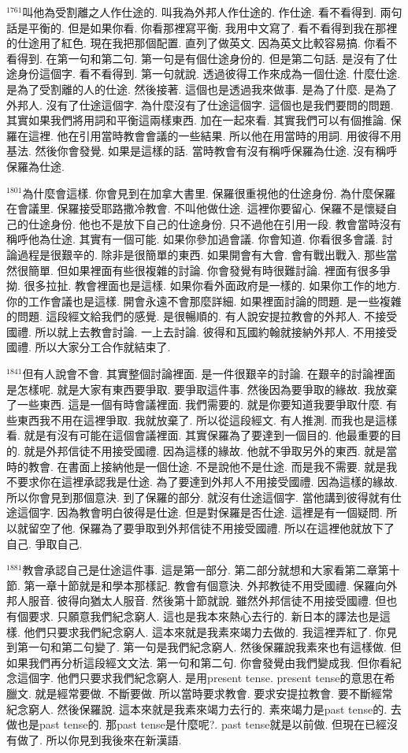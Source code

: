 \documentclass{book}
\begin{document}
$^{1761}$叫他為受割離之人作仕途的.
叫我為外邦人作仕途的.
作仕途.
看不看得到.
兩句話是平衡的.
但是如果你看.
你看那裡寫平衡.
我用中文寫了.
看不看得到我在那裡的仕途用了紅色.
現在我把那個配置.
直列了做英文.
因為英文比較容易搞.
你看不看得到.
在第一句和第二句.
第一句是有個仕途身份的.
但是第二句話.
是沒有了仕途身份這個字.
看不看得到.
第一句就說.
透過彼得工作來成為一個仕途.
什麼仕途.
是為了受割離的人的仕途.
然後接著.
這個也是透過我來做事.
是為了什麼.
是為了外邦人.
沒有了仕途這個字.
為什麼沒有了仕途這個字.
這個也是我們要問的問題.
其實如果我們將用詞和平衡這兩樣東西.
加在一起來看.
其實我們可以有個推論.
保羅在這裡.
他在引用當時教會會議的一些結果.
所以他在用當時的用詞.
用彼得不用基法.
然後你會發覺.
如果是這樣的話.
當時教會有沒有稱呼保羅為仕途.
沒有稱呼保羅為仕途.

$^{1801}$為什麼會這樣.
你會見到在加拿大書里.
保羅很重視他的仕途身份.
為什麼保羅在會議里.
保羅接受耶路撒冷教會.
不叫他做仕途.
這裡你要留心.
保羅不是懷疑自己的仕途身份.
他也不是放下自己的仕途身份.
只不過他在引用一段.
教會當時沒有稱呼他為仕途.
其實有一個可能.
如果你參加過會議.
你會知道.
你看很多會議.
討論過程是很艱辛的.
除非是很簡單的東西.
如果開會有大會.
會有戰出戰入.
那些當然很簡單.
但如果裡面有些很複雜的討論.
你會發覺有時很難討論.
裡面有很多爭拗.
很多拉扯.
教會裡面也是這樣.
如果你看外面政府是一樣的.
如果你工作的地方.
你的工作會議也是這樣.
開會永遠不會那麼詳細.
如果裡面討論的問題.
是一些複雜的問題.
這段經文給我們的感覺.
是很暢順的.
有人說安提拉教會的外邦人.
不接受國禮.
所以就上去教會討論.
一上去討論.
彼得和瓦國約翰就接納外邦人.
不用接受國禮.
所以大家分工合作就結束了.

$^{1841}$但有人說會不會.
其實整個討論裡面.
是一件很艱辛的討論.
在艱辛的討論裡面是怎樣呢.
就是大家有東西要爭取.
要爭取這件事.
然後因為要爭取的緣故.
我放棄了一些東西.
這是一個有時會議裡面.
我們需要的.
就是你要知道我要爭取什麼.
有些東西我不用在這裡爭取.
我就放棄了.
所以從這段經文.
有人推測.
而我也是這樣看.
就是有沒有可能在這個會議裡面.
其實保羅為了要達到一個目的.
他最重要的目的.
就是外邦信徒不用接受國禮.
因為這樣的緣故.
他就不爭取另外的東西.
就是當時的教會.
在書面上接納他是一個仕途.
不是說他不是仕途.
而是我不需要.
就是我不要求你在這裡承認我是仕途.
為了要達到外邦人不用接受國禮.
因為這樣的緣故.
所以你會見到那個意決.
到了保羅的部分.
就沒有仕途這個字.
當他講到彼得就有仕途這個字.
因為教會明白彼得是仕途.
但是對保羅是否仕途.
這裡是有一個疑問.
所以就留空了他.
保羅為了要爭取到外邦信徒不用接受國禮.
所以在這裡他就放下了自己.
爭取自己.

$^{1881}$教會承認自己是仕途這件事.
這是第一部分.
第二部分就想和大家看第二章第十節.
第一章十節就是和學本那樣記.
教會有個意決.
外邦教徒不用受國禮.
保羅向外邦人服音.
彼得向猶太人服音.
然後第十節就說.
雖然外邦信徒不用接受國禮.
但也有個要求.
只願意我們紀念窮人.
這也是我本來熱心去行的.
新日本的譯法也是這樣.
他們只要求我們紀念窮人.
這本來就是我素來竭力去做的.
我這裡弄紅了.
你見到第一句和第二句變了.
第一句是我們紀念窮人.
然後保羅說我素來也有這樣做.
但如果我們再分析這段經文文法.
第一句和第二句.
你會發覺由我們變成我.
但你看紀念這個字.
他們只要求我們紀念窮人.
是用present tense.
present tense的意思在希臘文.
就是經常要做.
不斷要做.
所以當時要求教會.
要求安提拉教會.
要不斷經常紀念窮人.
然後保羅說.
這本來就是我素來竭力去行的.
素來竭力是past tense的.
去做也是past tense的.
那past tense是什麼呢?.
past tense就是以前做.
但現在已經沒有做了.
所以你見到我後來在新漢語.
\end{document}

